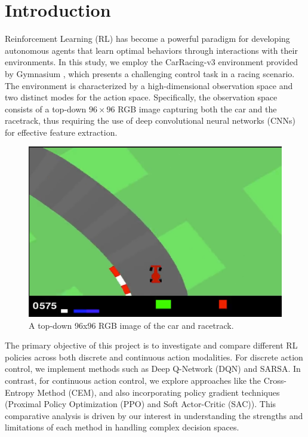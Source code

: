 \documentclass[../CSC_52081_EP.tex]{subfiles}
\begin{document}
    \section{Introduction}
    \label{sec:intro}

Reinforcement Learning (RL) has become a powerful paradigm for developing autonomous agents that learn optimal behaviors through interactions with their environments. In this study, we employ the CarRacing-v3 environment provided by Gymnasium \cite{gymnasium}, which presents a challenging control task in a racing scenario. The environment is characterized by a high-dimensional observation space and two distinct modes for the action space. Specifically, the observation space consists of a top-down \(96\times96\) RGB image capturing both the car and the racetrack, thus requiring the use of deep convolutional neural networks (CNNs) for effective feature extraction.

\begin{figure}[H]
    \centering
    \includegraphics[scale = 0.3]{figures/car_racing_v3.png}
    \caption{A top-down 96x96 RGB image of the car and racetrack.}
    \label{fig:car_racing_v3}
\end{figure}

The primary objective of this project is to investigate and compare different RL policies across both discrete and continuous action modalities. For discrete action control, we implement methods such as Deep Q-Network (DQN) and SARSA. In contrast, for continuous action control, we explore approaches like the Cross-Entropy Method (CEM), and also incorporating policy gradient techniques (Proximal Policy Optimization (PPO) and Soft Actor-Critic (SAC)). This comparative analysis is driven by our interest in understanding the strengths and limitations of each method in handling complex decision spaces.
\end{document}
